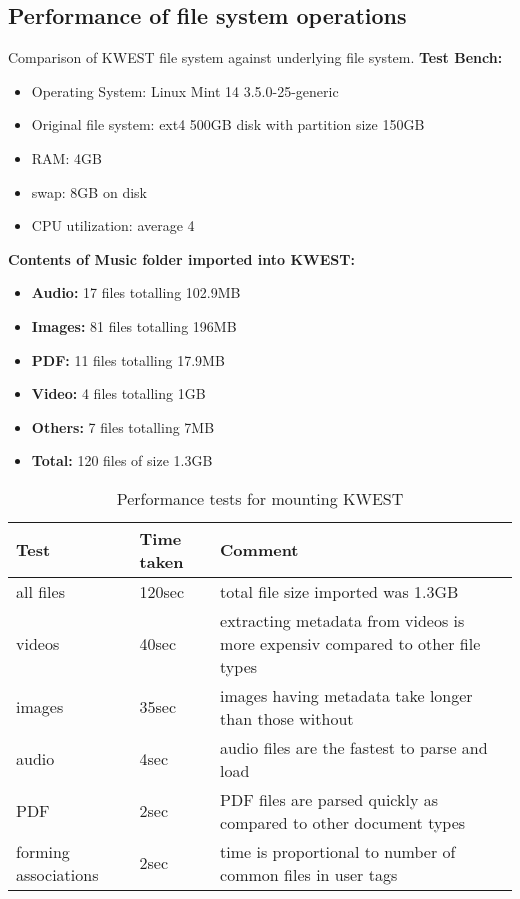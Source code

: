 \subsection{Performance of file system operations}
Comparison of KWEST file system against underlying file system.
\textbf{Test Bench:}
\begin{itemize}
\item Operating System: Linux Mint 14 3.5.0-25-generic
\item Original file system: ext4 500GB disk with partition size 150GB
\item RAM: 4GB
\item swap: 8GB on disk
\item CPU utilization: average 4%
\end{itemize}
\textbf{Contents of Music folder imported into KWEST:}
\begin{itemize}
\item \textbf{Audio:} 17 files totalling 102.9MB
\item \textbf{Images:} 81 files totalling 196MB
\item \textbf{PDF:} 11 files totalling 17.9MB
\item \textbf{Video:} 4 files totalling 1GB
\item \textbf{Others:} 7 files totalling 7MB
\item \textbf{Total:} 120 files of size 1.3GB
\end{itemize}

\begin{table}[h]
\begin{tabular}{|p{3cm}|p{2cm}|p{7cm}|}
\hline
\textbf{Test} & \textbf{Time taken} & \textbf{Comment} \\ \hline
all files	&	120sec	& total file size imported was 1.3GB \\ \hline
videos	& 40sec	&	extracting metadata from videos is more expensiv compared to other file types \\ \hline
images	& 35sec & images having metadata take longer than those without \\ \hline
audio 	& 4sec	& audio files are the fastest to parse and load \\ \hline
PDF		& 2sec	& PDF files are parsed quickly as compared to other document types \\ \hline
forming associations & 2sec	 & time is proportional to number of common files in user tags \\
\hline
\end{tabular}
\caption{Performance tests for mounting KWEST}
\label{performancemount}
\end{table}

